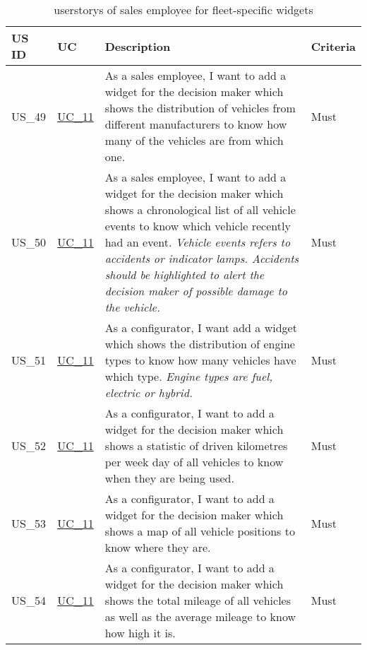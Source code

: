   \label{FlottenWidgets}
  \sffamily
  \begin{footnotesize}
    \begin{longtable}[L L L L ]{ p{} p{} p{} p{}}
      \caption                       %
          {\Glspl{userstory} of sales employee for fleet-specific \glspl{widget}} %
          \\
      \toprule
      \textbf{US ID} & \textbf{UC} & \textbf{Description} & \textbf{Criteria} \\
      \midrule
      \hypertarget{Ref:US49}{US\_49} & \hyperlink{Ref:UC11}{UC\_11} & As a sales employee, I want to add a \gls{widget} for the decision maker which shows the distribution of vehicles from different manufacturers to know how many of the vehicles are from which one. & Must  \\
      \hypertarget{Ref:US50}{US\_50} & \hyperlink{Ref:UC11}{UC\_11} & As a sales employee, I want to add a \gls{widget} for the decision maker which shows a chronological list of all vehicle events to know which vehicle recently had an event.
      \newline
      \emph{Vehicle events refers to accidents or indicator lamps. Accidents should be highlighted to alert the decision maker of possible damage to the vehicle.} & Must \\
      \hypertarget{Ref:US51}{US\_51} & \hyperlink{Ref:UC11}{UC\_11} & As a configurator, I want add a \gls{widget} which shows the distribution of engine types to know how many vehicles have which type. 
      \newline
      \emph{Engine types are fuel, electric or hybrid.} & Must \\
      \hypertarget{Ref:US52}{US\_52} & \hyperlink{Ref:UC11}{UC\_11} & As a configurator, I want to add a \gls{widget} for the decision maker which shows a statistic of driven kilometres per week day of all vehicles to know when they are being used. & Must \\
      \hypertarget{Ref:US53}{US\_53} & \hyperlink{Ref:UC11}{UC\_11} & As a configurator, I want to add a \gls{widget} for the decision maker which shows a map of all vehicle positions to know where they are. & Must \\
      \hypertarget{Ref:US54}{US\_54} & \hyperlink{Ref:UC11}{UC\_11} & As a configurator, I want to add a \gls{widget} for the decision maker which shows the total mileage of all vehicles as well as the average mileage to know how high it is. & Must \\
      \bottomrule
    \end{longtable}
  \end{footnotesize}
  \rmfamily
